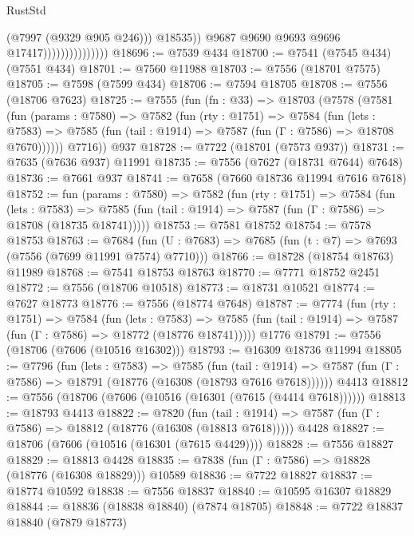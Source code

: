 \begin{lexlean}{RustStd}
\begin{coremodule}
{\begin{coremodule}
{{{{{{{{{{{{{{{{{{{{{{{{{{{{{{{{{{{{{{{{{{{                                        (@7997 (@9329 @905 @246)))
                                      @18535))
                                  @9687
                                  @9690
                                  @9693
                                  @9696
                                  @17417)))))))))))))))
@18696 := @7539 @434
@18700 := @7541 (@7545 @434) (@7551 @434)
@18701 := @7560 @11988
@18703 := @7556 (@18701 @7575)
@18705 := @7598 (@7599 @434)
@18706 := @7594 @18705
@18708 := @7556 (@18706 @7623)
@18725 := @7555
    (fun (fn : @33) =>
    @18703
      (@7578
        (@7581
          (fun (params : @7580) =>
          @7582
            (fun (rty : @1751) =>
            @7584
              (fun (lets : @7583) =>
              @7585 (fun (tail : @1914) => @7587 (fun (Γ : @7586) => @18708 @7670))))))
        @7716))
    @937
@18728 := @7722 (@18701 (@7573 @937))
@18731 := @7635 (@7636 @937) @11991
@18735 := @7556 (@7627 (@18731 @7644) @7648)
@18736 := @7661 @937
@18741 := @7658 (@7660 @18736 @11994 @7616 @7618)
@18752 := fun (params : @7580) =>
  @7582
    (fun (rty : @1751) =>
    @7584
      (fun (lets : @7583) =>
      @7585 (fun (tail : @1914) => @7587 (fun (Γ : @7586) => @18708 (@18735 @18741)))))
@18753 := @7581 @18752
@18754 := @7578 @18753
@18763 := @7684
    (fun (U : @7683) => @7685 (fun (t : @7) => @7693 (@7556 (@7699 @11991 @7574) @7710)))
@18766 := @18728 (@18754 @18763) @11989
@18768 := @7541 @18753 @18763
@18770 := @7771 @18752 @2451
@18772 := @7556 (@18706 @10518)
@18773 := @18731 @10521
@18774 := @7627 @18773
@18776 := @7556 (@18774 @7648)
@18787 := @7774
    (fun (rty : @1751) =>
    @7584
      (fun (lets : @7583) =>
      @7585 (fun (tail : @1914) => @7587 (fun (Γ : @7586) => @18772 (@18776 @18741)))))
    @1776
@18791 := @7556 (@18706 (@7606 (@10516 @16302)))
@18793 := @16309 @18736 @11994
@18805 := @7796
    (fun (lets : @7583) =>
    @7585
      (fun (tail : @1914) =>
      @7587 (fun (Γ : @7586) => @18791 (@18776 (@16308 (@18793 @7616 @7618))))))
    @4413
@18812 := @7556 (@18706 (@7606 (@10516 (@16301 (@7615 (@4414 @7618))))))
@18813 := @18793 @4413
@18822 := @7820
    (fun (tail : @1914) => @7587 (fun (Γ : @7586) => @18812 (@18776 (@16308 (@18813 @7618)))))
    @4428
@18827 := @18706 (@7606 (@10516 (@16301 (@7615 @4429))))
@18828 := @7556 @18827
@18829 := @18813 @4428
@18835 := @7838 (fun (Γ : @7586) => @18828 (@18776 (@16308 @18829))) @10589
@18836 := @7722 @18827
@18837 := @18774 @10592
@18838 := @7556 @18837
@18840 := @10595 @16307 @18829
@18844 := @18836 (@18838 @18840) (@7874 @18705)
@18848 := @7722 @18837 @18840 (@7879 @18773)
}}}}}}}}}}}}}}}}}}}}}}}}}}}}}}}}}}}}}}}}}}}
\end{coremodule}}
\end{coremodule}
\end{lexlean}
